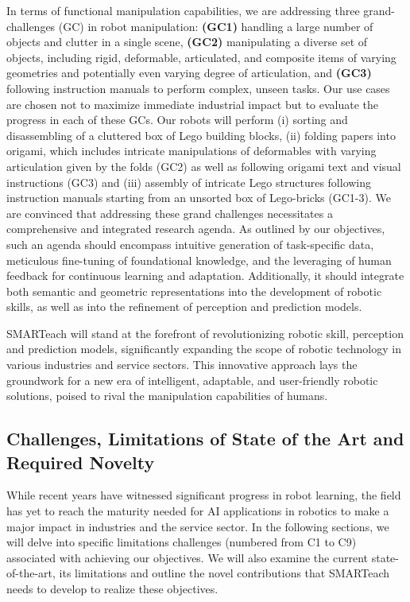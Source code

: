 \documentclass{erc-B2}
\begin{document}
In terms of functional manipulation capabilities, we are addressing three grand-challenges (GC) in robot manipulation: \textbf{(GC1)} handling a large number of objects and clutter in a single scene, \textbf{(GC2)} manipulating a diverse set of objects, including rigid, deformable, articulated, and composite items of varying geometries and potentially even  varying degree of articulation, and \textbf{(GC3)} following instruction manuals to perform complex, unseen tasks. Our use cases are chosen not to maximize immediate industrial impact but to evaluate the progress in each of these GCs. Our robots will perform (i) sorting and disassembling of a cluttered box of Lego building blocks, (ii) folding papers into origami, which includes intricate manipulations of deformables with varying articulation given by the folds (GC2) as well as following origami text and visual instructions (GC3) and (iii) assembly of intricate Lego structures following instruction manuals starting from an unsorted box of Lego-bricks (GC1-3). We are convinced that addressing these grand challenges necessitates a comprehensive and integrated research agenda. As outlined by our objectives, such an agenda should encompass intuitive generation of task-specific data, meticulous fine-tuning of foundational knowledge, and the leveraging of human feedback for continuous learning and adaptation. Additionally, it should integrate both semantic and geometric representations into the development of robotic skills, as well as into the refinement of perception and prediction models.

SMARTeach will stand at the forefront of revolutionizing robotic skill, perception and prediction models, significantly expanding the scope of robotic technology in various industries and service sectors. This innovative approach lays the groundwork for a new era of intelligent, adaptable, and user-friendly robotic solutions, poised to rival the manipulation capabilities of humans.


\subsection{Challenges, Limitations of State of the Art and Required Novelty}
While recent years have witnessed significant progress in robot learning, the field has yet to reach the maturity needed for AI applications in robotics to make a major impact in industries and the service sector. In the following sections, we will delve into specific limitations challenges (numbered from C1 to C9) associated with achieving our objectives. We will also examine the current state-of-the-art, its limitations and outline the novel contributions that SMARTeach needs to develop to realize these objectives.
\end{document}
